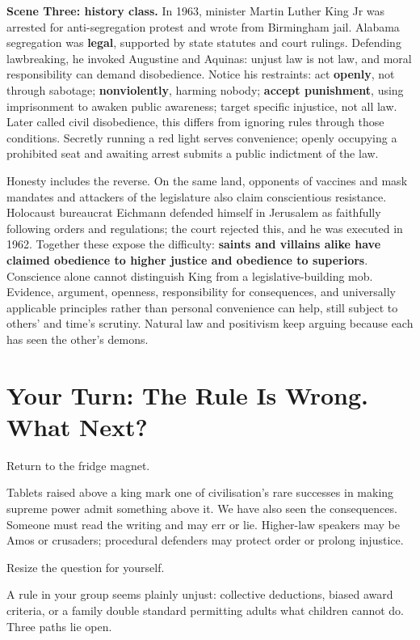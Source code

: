\textbf{Scene Three: history class.} In 1963, minister Martin Luther King Jr was arrested for anti-segregation protest and wrote from Birmingham jail. Alabama segregation was \textbf{legal}, supported by state statutes and court rulings. Defending lawbreaking, he invoked Augustine and Aquinas: unjust law is not law, and moral responsibility can demand disobedience. Notice his restraints: act \textbf{openly}, not through sabotage; \textbf{nonviolently}, harming nobody; \textbf{accept punishment}, using imprisonment to awaken public awareness; target specific injustice, not all law. Later called civil disobedience, this differs from ignoring rules through those conditions. Secretly running a red light serves convenience; openly occupying a prohibited seat and awaiting arrest submits a public indictment of the law.

Honesty includes the reverse. On the same land, opponents of vaccines and mask mandates and attackers of the legislature also claim conscientious resistance. Holocaust bureaucrat Eichmann defended himself in Jerusalem as faithfully following orders and regulations; the court rejected this, and he was executed in 1962. Together these expose the difficulty: \textbf{saints and villains alike have claimed obedience to higher justice and obedience to superiors}. Conscience alone cannot distinguish King from a legislative-building mob. Evidence, argument, openness, responsibility for consequences, and universally applicable principles rather than personal convenience can help, still subject to others' and time's scrutiny. Natural law and positivism keep arguing because each has seen the other's demons.

\section{Your Turn: The Rule Is Wrong. What Next?}
Return to the fridge magnet.

Tablets raised above a king mark one of civilisation's rare successes in making supreme power admit something above it. We have also seen the consequences. Someone must read the writing and may err or lie. Higher-law speakers may be Amos or crusaders; procedural defenders may protect order or prolong injustice.

Resize the question for yourself.

A rule in your group seems plainly unjust: collective deductions, biased award criteria, or a family double standard permitting adults what children cannot do. Three paths lie open.

